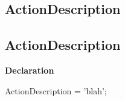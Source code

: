 \documentclass{report}
\newif\ifpdf
\begin{document}
\subsection*{\large{\textbf{ActionDescription}}\normalsize\hspace{1ex}\hrulefill}
\else
\subsection*{ActionDescription}
\fi
\label{ok_back_comment_private-ActionDescription}
\begin{list}{}{
\setlength{\itemindent}{0cm}
\setlength{\listparindent}{0cm}
\setlength{\leftmargin}{\evensidemargin}
\addtolength{\leftmargin}{\tmplength}
\settowidth{\labelsep}{X}
\addtolength{\leftmargin}{\labelsep}
\setlength{\labelwidth}{\tmplength}
}
\item[\textbf{Declaration}\hfill]
\ifpdf
\begin{flushleft}
\fi
\begin{ttfamily}
ActionDescription = 'blah';\end{ttfamily}

\ifpdf
\end{flushleft}
\fi

\end{list}
\end{document}

